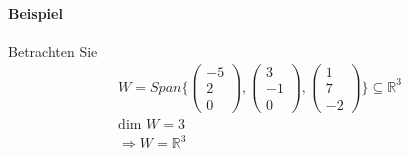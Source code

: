\documentclass[11pt]{report}
\newcommand*\Zb[1] {\mathbb{#1}}
\begin{document}
\paragraph{Beispiel}
Betrachten Sie 
\begin{align}
W = Span\{\begin{pmatrix} -5 \\ 2 \\ 0 \end{pmatrix}, \begin{pmatrix} 3 \\ -1 \\ 0 \end{pmatrix}, \begin{pmatrix} 1 \\ 7 \\ -2 \end{pmatrix}\} \subseteq \Zb{R}^3 \\
\text{dim } W = 3\\
\Rightarrow W = \Zb{R}^3
\end{align}
\end{document}
